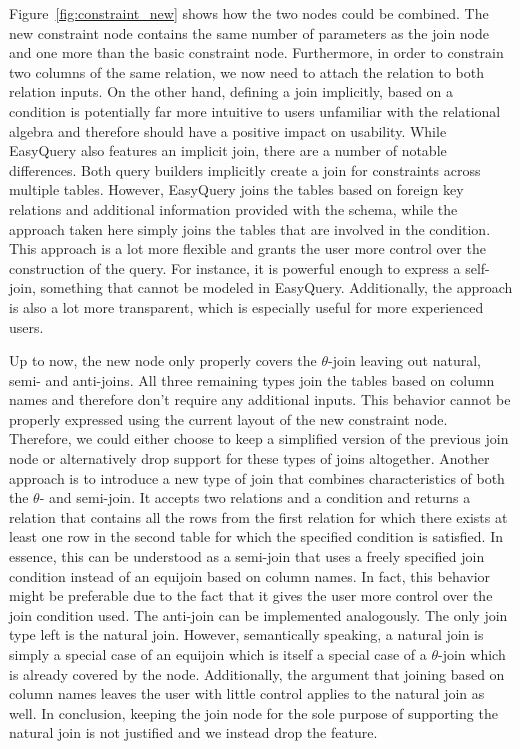 \documentclass[11pt,a4paper]{globis-book}
\begin{document}
Figure~\ref{fig:constraint_new} shows how the two nodes could be combined. The new constraint node contains the same number of parameters as the join node and one more than the basic constraint node. Furthermore, in order to constrain two columns of the same relation, we now need to attach the relation to both relation inputs. On the other hand, defining a join implicitly, based on a condition is potentially far more intuitive to users unfamiliar with the relational algebra and therefore should have a positive impact on usability. While EasyQuery also features an implicit join, there are a number of notable differences. Both query builders implicitly create a join for constraints across multiple tables. However, EasyQuery joins the tables based on foreign key relations and additional information provided with the schema, while the approach taken here simply joins the tables that are involved in the condition. This approach is a lot more flexible and grants the user more control over the construction of the query. For instance, it is powerful enough to express a self-join, something that cannot be modeled in EasyQuery. Additionally, the approach is also a lot more transparent, which is especially useful for more experienced users.

Up to now, the new node only properly covers the $\theta$-join leaving out natural, semi- and anti-joins. All three remaining types join the tables based on column names and therefore don't require any additional inputs. This behavior cannot be properly expressed using the current layout of the new constraint node. Therefore, we could either choose to keep a simplified version of the previous join node or alternatively drop support for these types of joins altogether. Another approach is to introduce a new type of join that combines characteristics of both the $\theta$- and semi-join. It accepts two relations and a condition and returns a relation that contains all the rows from the first relation for which there exists at least one row in the second table for which the specified condition is satisfied. In essence, this can be understood as a semi-join that uses a freely specified join condition instead of an equijoin based on column names. In fact, this behavior might be preferable due to the fact that it gives the user more control over the join condition used. The anti-join can be implemented analogously. The only join type left is the natural join. However, semantically speaking, a natural join is simply a special case of an equijoin which is itself a special case of a $\theta$-join which is already covered by the node. Additionally, the argument that joining based on column names leaves the user with little control applies to the natural join as well. In conclusion, keeping the join node for the sole purpose of supporting the natural join is not justified and we instead drop the feature.
\end{document}
